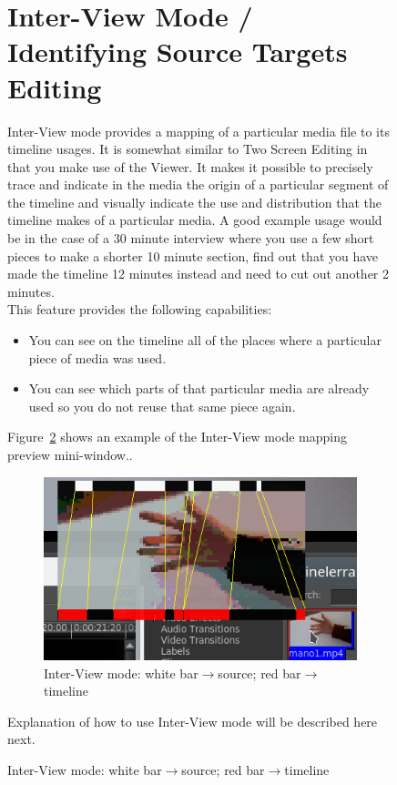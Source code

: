 \begin{figure}
\section{Inter-View Mode / Identifying Source Targets Editing}%
\label{sec:inter-view_identifying_source_target_editing}

Inter-View mode provides a mapping of a particular media file to its timeline usages. It is somewhat similar to Two Screen Editing in that you make use of the Viewer. It makes it possible to precisely trace and indicate in the media the origin of a particular segment of the timeline and visually indicate the use and distribution that the timeline makes of a particular media.   A good example usage would be in the case of a 30 minute interview where you use a few short pieces to make a shorter 10 minute section, find out that you have made the timeline 12 minutes instead and need to cut out another 2 minutes. \\
This feature provides the following capabilities:
\begin{itemize}
    \item You can see on the timeline all of the places where a particular piece of media was used.
    \item You can see which parts of that particular media are already used so you do not reuse that same 
    piece again.
\end{itemize}
Figure~\ref{fig:inter-view01} shows an example of the Inter-View mode mapping preview mini-window..
\begin{figure}[htpb]
    \centering
    \includegraphics[width=0.8\linewidth]{images/inter-view01.png}
    \caption{Inter-View mode: white bar$\rightarrow$source; red bar$\rightarrow$timeline}
    \label{fig:inter-view01}
\end{figure}

Explanation of how to use Inter-View mode will be described here next.


\end{figure}

